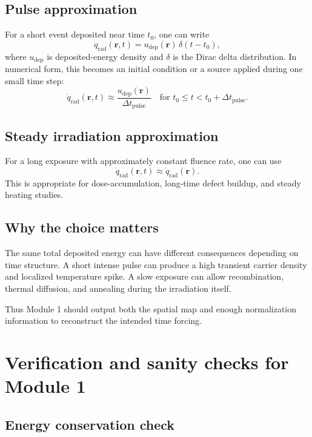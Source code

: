 \documentclass[11pt]{article}
\newcommand{\qrad}{\dot{q}_{\mathrm{rad}}}
\newcommand{\rpos}{\mathbf{r}}
\begin{document}
\subsection{Pulse approximation}

For a short event deposited near time $t_0$, one can write
\begin{equation}
\qrad(\rpos,t)
=u_{\mathrm{dep}}(\rpos)\,\delta(t-t_0),
\end{equation}
where $u_{\mathrm{dep}}$ is deposited-energy density and $\delta$ is the Dirac delta distribution. In numerical form, this becomes an initial condition or a source applied during one small time step:
\begin{equation}
\qrad(\rpos,t)\approx \frac{u_{\mathrm{dep}}(\rpos)}{\Delta t_{\mathrm{pulse}}}
\quad \text{for } t_0\le t<t_0+\Delta t_{\mathrm{pulse}}.
\end{equation}

\subsection{Steady irradiation approximation}

For a long exposure with approximately constant fluence rate, one can use
\begin{equation}
\qrad(\rpos,t)\approx \qrad(\rpos).
\end{equation}
This is appropriate for dose-accumulation, long-time defect buildup, and steady heating studies.

\subsection{Why the choice matters}

The same total deposited energy can have different consequences depending on time structure. A short intense pulse can produce a high transient carrier density and localized temperature spike. A slow exposure can allow recombination, thermal diffusion, and annealing during the irradiation itself.

Thus Module 1 should output both the spatial map and enough normalization information to reconstruct the intended time forcing.

\section{Verification and sanity checks for Module 1}

\subsection{Energy conservation check}
\end{document}
